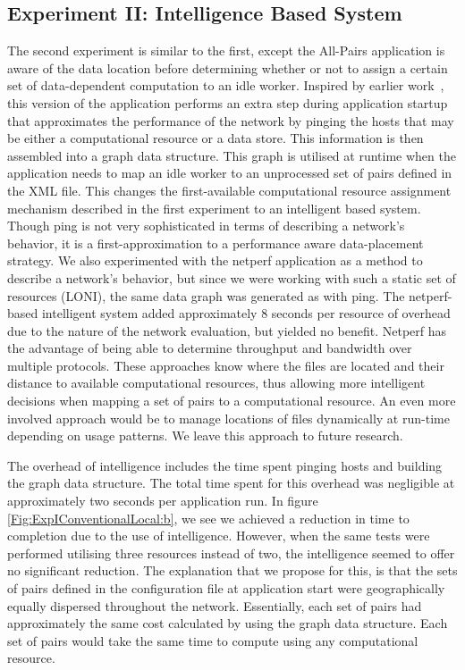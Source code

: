 \documentclass{rspublic}
\begin{document}
\subsection{Experiment II: Intelligence Based System}\label{Sec:Intelligence}
The second experiment is similar to the first, except the All-Pairs
application is aware of the data location before determining whether or
not to assign a certain set of data-dependent computation to an idle
worker. Inspired by earlier work~\citep{netperf}, this version of the
application performs an extra step during application startup that
approximates the performance of the network by pinging the hosts that
may be either a computational resource or a data store. This information
is then assembled into a graph data structure. This graph is utilised at
runtime when the application needs to map an idle worker to an
unprocessed set of pairs defined in the XML file. This changes the
first-available computational resource assignment mechanism described in
the first experiment to an intelligent based system. Though ping is not
very sophisticated in terms of describing a network's behavior, it is a
first-approximation to a performance aware data-placement strategy. We
also experimented with the netperf application \citep{netperf_web} as a
method to describe a network's behavior, but since we were working with
such a static set of resources (LONI), the same data graph was generated
as with ping. The netperf-based intelligent system added approximately 8
seconds per resource of overhead due to the nature of the network
evaluation, but yielded no benefit.  Netperf has the advantage of being
able to determine throughput and bandwidth over multiple protocols.
These approaches know where the files are located and their distance to
available computational resources, thus allowing more intelligent
decisions when mapping a set of pairs to a computational resource. An
even more involved approach would be to manage locations of files
dynamically at run-time depending on usage patterns. We leave this
approach to future research. 

The overhead of intelligence includes the time spent pinging hosts and
building the graph data structure. The total time spent for this
overhead was negligible at approximately two seconds per application
run. In figure \ref{Fig:ExpIConventionalLocal:b}, we see we achieved a
reduction in time to completion due to the use of intelligence. However,
when the same tests were performed utilising three resources instead of
two, the intelligence seemed to offer no significant reduction. The
explanation that we propose for this, is that the sets of pairs defined
in the configuration file at application start were geographically
equally dispersed throughout the network. Essentially, each set of pairs
had approximately the same cost calculated by using the graph data
structure. Each set of pairs would take the same time to compute using
any computational resource.
\end{document}
